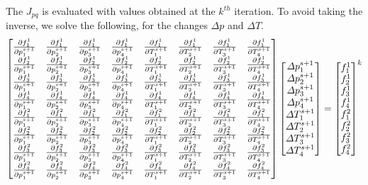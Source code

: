\documentclass[preprint,12pt]{elsarticle}
\numberwithin{equation}{section}
\begin{document}
The $J_{pq}$ is evaluated with values obtained at the $k^{th}$ iteration. To avoid taking the inverse, we solve the following, for the changes $\Delta p$ and $\Delta T$.
\begin{equation}
	\begin{bmatrix}
		\JPP{1}{1} & \JPP{1}{2} & \JPP{1}{3} & \JPP{1}{4} & \JPT{1}{1} & \JPT{1}{2}&\JPT{1}{3}&\JPT{1}{4}\\
		
		\JPP{2}{1} & \JPP{2}{2} & \JPP{2}{3} & \JPP{2}{4} & \JPT{2}{1} & \JPT{2}{2}&\JPT{2}{3}&\JPT{2}{4}\\
		
		\JPP{3}{1} & \JPP{3}{2} & \JPP{3}{3} & \JPP{3}{4} & \JPT{3}{1} & \JPT{3}{2}&\JPT{3}{3}&\JPT{3}{4}\\
		
		\JPP{4}{1} & \JPP{4}{2} & \JPP{4}{3} & \JPP{4}{4} & \JPT{4}{1} & \JPT{4}{2}&\JPT{4}{3}&\JPT{4}{4}\\
		\JTP{1}{1} & \JTP{1}{2} & \JTP{1}{3} & \JTP{1}{4} & \JTT{1}{1} & \JTT{1}{2}&\JTT{1}{3}&\JTT{1}{4}\\
		
		\JTP{2}{1} & \JTP{2}{2} & \JTP{2}{3} & \JTP{2}{4} & \JTT{2}{1} & \JTT{2}{2}&\JTT{2}{3}&\JTT{2}{4}\\
		
		\JTP{3}{1} & \JTP{3}{2} & \JTP{3}{3} & \JTP{3}{4} & \JTT{3}{1} & \JTT{3}{2}&\JTT{3}{3}&\JTT{3}{4}\\
		
		\JTP{4}{1} & \JTP{4}{2} & \JTP{4}{3} & \JTP{4}{4} & \JTT{4}{1} & \JTT{4}{2}&\JTT{4}{3}&\JTT{4}{4}
	\end{bmatrix}
	\begin{bmatrix}
		\Delta p_1^{s+1}\\
		\Delta p_2^{s+1}\\
		\Delta p_3^{s+1}\\
		\Delta p_4^{s+1}\\
		\Delta T_1^{s+1}\\
		\Delta T_2^{s+1}\\
		\Delta T_3^{s+1}\\
		\Delta T_4^{s+1}
	\end{bmatrix}=
	\begin{bmatrix}
		f_1^{1}\\
		f_2^{1}\\
		f_3^{1}\\
		f_4^{1}\\
		f_1^{2}\\
		f_2^{2}\\
		f_3^{2}\\
		f_4^{2}
	\end{bmatrix}^{k}
\end{equation}
\end{document}
